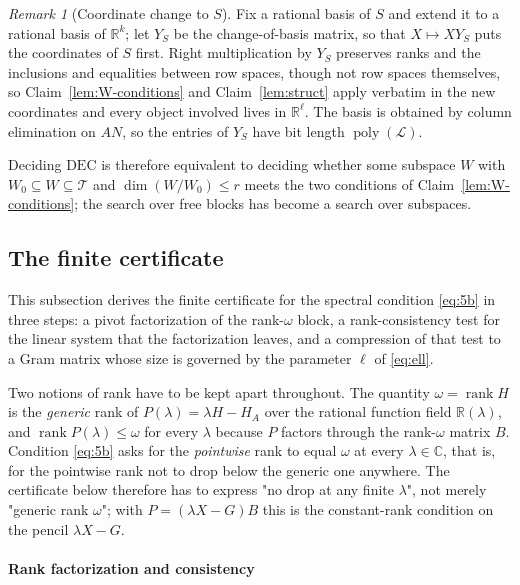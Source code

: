 \documentclass[journal]{IEEEtran}
\theoremstyle{plainn}
\theoremstyle{remark}
\newtheorem{remark}{Remark}
\begin{document}
\begin{remark}[Coordinate change to $S$]\label{rem:YS}
Fix a rational basis of $S$ and extend it to a rational basis of $\mathbb R^k$; let $Y_S$ be
the change-of-basis matrix, so that $X\mapsto XY_S$ puts the coordinates of $S$ first. Right
multiplication by $Y_S$ preserves ranks and the inclusions and equalities between row spaces,
though not row spaces themselves, so Claim~\ref{lem:W-conditions} and
Claim~\ref{lem:struct} apply verbatim in the new coordinates and every object involved lives
in $\mathbb R^\ell$. The basis is obtained by column elimination on $AN$, so the entries of
$Y_S$ have bit length $\operatorname{poly}(\mathcal L)$.
\end{remark}

Deciding $\mathrm{DEC}$ is therefore equivalent to deciding whether some subspace $W$ with
$W_0\subseteq W\subseteq\mathcal T$ and $\dim(W/W_0)\le r$ meets the two conditions of
Claim~\ref{lem:W-conditions}; the search over free blocks has become a search over subspaces.

\subsection{The finite certificate}\label{sec:certificate}

This subsection derives the finite certificate for the spectral condition \eqref{eq:5b} in three steps:
a pivot factorization of the rank-$\omega$ block, a rank-consistency test for the linear system that
the factorization leaves, and a compression of that test to a Gram matrix whose size is governed by the
parameter $\ell$ of \eqref{eq:ell}.

Two notions of rank have to be kept apart throughout. The quantity $\omega=\operatorname{rank}H$ is the
\emph{generic} rank of $P(\lambda)=\lambda H-H_A$ over the rational function field $\mathbb R(\lambda)$,
and $\operatorname{rank}P(\lambda)\le\omega$ for every $\lambda$ because $P$ factors through the
rank-$\omega$ matrix $B$. Condition \eqref{eq:5b} asks for the \emph{pointwise} rank to equal $\omega$ at
every $\lambda\in\mathbb C$, that is, for the pointwise rank not to drop below the generic one anywhere.
The certificate below therefore has to express "no drop at any finite $\lambda$", not merely "generic
rank $\omega$"; with $P=(\lambda X-G)B$ this is the constant-rank condition on the pencil $\lambda X-G$.

\paragraph*{Rank factorization and consistency}\label{sec:consistency}
\end{document}
